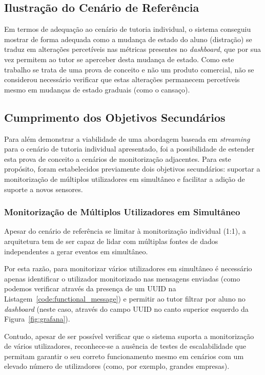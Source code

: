 \subsection{Ilustração do Cenário de Referência}

Em termos de adequação ao cenário de tutoria individual, o sistema conseguiu mostrar de forma adequada como a mudança de estado do aluno (distração) se traduz em alterações percetíveis nas métricas presentes no \textit{dashboard}, que por sua vez permitem ao tutor se aperceber desta mudança de estado.
Como este trabalho se trata de uma prova de conceito e não um produto comercial, não se considerou necessário verificar que estas alterações permanecem percetíveis mesmo em mudanças de estado graduais (como o cansaço).

\subsection{Cumprimento dos Objetivos Secundários}

Para além demonstrar a viabilidade de uma abordagem baseada em \textit{streaming} para o cenário de tutoria individual apresentado, foi a possibilidade de estender esta prova de conceito a cenários de monitorização adjacentes.
Para este propósito, foram estabelecidos previamente dois objetivos secundários: suportar a monitorização de múltiplos utilizadores em simultâneo e facilitar a adição de suporte a novos sensores.

\subsubsection{Monitorização de Múltiplos Utilizadores em Simultâneo}

Apesar do cenário de referência se limitar à monitorização individual (1:1), a arquitetura tem de ser capaz de lidar com múltiplas fontes de dados independentes a gerar eventos em simultâneo.

Por esta razão, para monitorizar vários utilizadores em simultâneo é necessário apenas identificar o utilizador monitorizado nas mensagens enviadas (como podemos verificar através da presença de um \ac{UUID} na Listagem~\ref{code:functional_message}) e permitir ao tutor filtrar por aluno no \textit{dashboard} (neste caso, através do campo \ac{UUID} no canto superior esquerdo da Figura~\ref{fig:grafana}).

Contudo, apesar de ser possível verificar que o sistema suporta a monitorização de vários utilizadores, reconhece-se a ausência de testes de escalabilidade que permitam garantir o seu correto funcionamento mesmo em cenários com um elevado número de utilizadores (como, por exemplo, grandes empresas).

